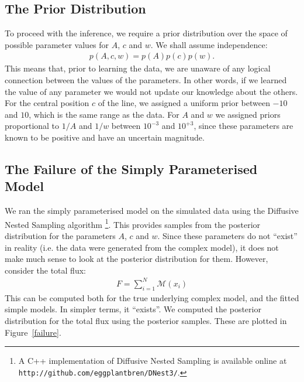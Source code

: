 \documentclass[letterpaper, 11pt]{article}
\begin{document}
\subsection{The Prior Distribution}
To proceed with the inference, we require a prior distribution over the space
of possible parameter values for $A$, $c$ and $w$. We shall assume independence:
\begin{eqnarray}
p(A, c, w) = p(A)p(c)p(w).
\end{eqnarray}
This means that, prior to learning the data, we are unaware of any logical
connection between the values of the parameters. In other words, if we learned the
value of any parameter we would not update our knowledge about the others.
For the central position $c$ of the line, we assigned a uniform prior between
$-10$ and $10$, which is the same range as the data. For $A$ and $w$ we assigned
priors proportional to $1/A$ and $1/w$ between $10^{-3}$ and $10^{+3}$, since these
parameters are known to be positive and have an uncertain magnitude.

\subsection{The Failure of the Simply Parameterised Model}
We ran the simply parameterised model on the simulated data using the Diffusive
Nested Sampling algorithm \citep{dnest}
\footnote{A C++ implementation of Diffusive Nested Sampling is available
online at {\tt http://github.com/eggplantbren/DNest3/}.}. This provides samples
from the posterior distribution for the parameters $A$, $c$ and $w$. Since these
parameters do not ``exist'' in reality (i.e. the data were generated from the
complex model), it does not make much sense to look at the posterior distribution
for them. However, consider the total flux:
\begin{eqnarray}
F = \sum_{i=1}^N \mathcal{M}(x_i)
\end{eqnarray}
This can be computed both for the true underlying complex model, and the fitted
simple models. In simpler terms, it ``exists''. We computed the posterior distribution
for the total flux using the posterior samples. These are plotted in
Figure~\ref{failure}.
\end{document}
